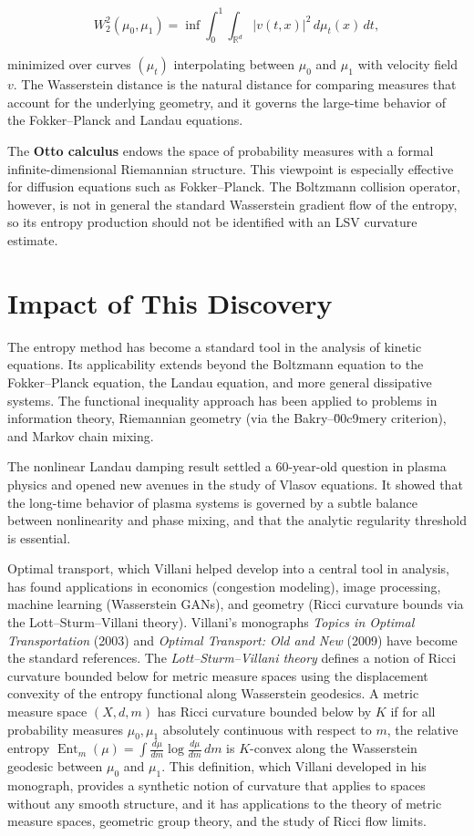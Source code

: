 \[
W_2^2(\mu_0,\mu_1) = \inf \int_0^1 \int_{\mathbb{R}^d} |v(t,x)|^2 \, d\mu_t(x) \, dt,
\]

minimized over curves $(\mu_t)$ interpolating between $\mu_0$ and $\mu_1$ with velocity field $v$. The Wasserstein distance is the natural distance for comparing measures that account for the underlying geometry, and it governs the large-time behavior of the Fokker--Planck and Landau equations.

The \textbf{Otto calculus} endows the space of probability measures with a formal infinite-dimensional Riemannian structure. This viewpoint is especially effective for diffusion equations such as Fokker--Planck. The Boltzmann collision operator, however, is not in general the standard Wasserstein gradient flow of the entropy, so its entropy production should not be identified with an LSV curvature estimate.

\section{Impact of This Discovery}\label{ch2010cedricvillani:impact-of-this-discovery}

The entropy method has become a standard tool in the analysis of kinetic equations. Its applicability extends beyond the Boltzmann equation to the Fokker--Planck equation, the Landau equation, and more general dissipative systems. The functional inequality approach has been applied to problems in information theory, Riemannian geometry (via the Bakry--\u00c9mery criterion), and Markov chain mixing.

The nonlinear Landau damping result settled a 60-year-old question in plasma physics and opened new avenues in the study of Vlasov equations. It showed that the long-time behavior of plasma systems is governed by a subtle balance between nonlinearity and phase mixing, and that the analytic regularity threshold is essential.

Optimal transport, which Villani helped develop into a central tool in analysis, has found applications in economics (congestion modeling), image processing, machine learning (Wasserstein GANs), and geometry (Ricci curvature bounds via the Lott--Sturm--Villani theory). Villani's monographs \emph{Topics in Optimal Transportation} (2003) and \emph{Optimal Transport: Old and New} (2009) have become the standard references. The \emph{Lott--Sturm--Villani theory} defines a notion of Ricci curvature bounded below for metric measure spaces using the displacement convexity of the entropy functional along Wasserstein geodesics. A metric measure space $(X, d, m)$ has Ricci curvature bounded below by $K$ if for all probability measures $\mu_0, \mu_1$ absolutely continuous with respect to $m$, the relative entropy $\operatorname{Ent}_m(\mu) = \int \frac{d\mu}{dm} \log \frac{d\mu}{dm} \, dm$ is $K$-convex along the Wasserstein geodesic between $\mu_0$ and $\mu_1$. This definition, which Villani developed in his monograph, provides a synthetic notion of curvature that applies to spaces without any smooth structure, and it has applications to the theory of metric measure spaces, geometric group theory, and the study of Ricci flow limits.

